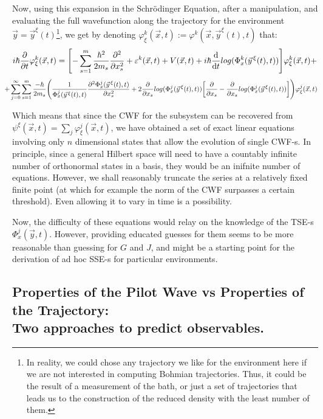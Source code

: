 \documentclass[11pt, a4paper]{article} %
\begin{document}
Now, using this expansion in the Schrödinger Equation, after a manipulation, and evaluating the full wavefunction along the trajectory for the environment $\vec{y}=\vec{y}^\xi(t)$\footnote{In reality, we could chose any trajectory we like for the environment here if we are not interested in computing Bohmian trajectories. Thus, it could be the result of a measurement of the bath, or just a set of trajectories that leads us to the construction of the reduced density with the least number of them.}, we get by denoting $\varphi^k_\xi(\vec{x},t):=\varphi^k(\vec{x},\vec{y}^\xi(t),t)$ that:
\begin{equation}
 i\hbar\pdv{}{t}\varphi^k_\xi(\vec{x},t)=\qty[-\sum_{s=1}^m\frac{\hbar^2}{2m_s}\pdv[2]{}{x_s}+ \varepsilon^k(\vec{x},t)+V(\vec{x},t)   +i\hbar \dv{}{t}log(\Phi^k_x(\vec{y}^{\, \xi}(t),t))]\varphi^k_\xi(\vec{x},t)+
\end{equation}
$$
\hspace{-0.4cm}+\sum_{j=0}^\infty\sum_{s=1}^m \frac{-\hbar}{2m_s}\qty( \frac{1}{\Phi^j_x(\vec{y}^{\, \xi}(t),t)}\pdv[2]{\Phi^j_x(\vec{y}^{\, \xi}(t),t)}{x_s}+2\pdv{}{x_s}log(\Phi^j_x(\vec{y}^{\, \xi}(t),t))\qty[\pdv{}{x_s}-\pdv{}{x_s}log(\Phi^j_x(\vec{y}^{\, \xi}(t),t))] )\varphi^j_\xi(\vec{x},t)
$$

Which means that since the CWF for the subsystem can be recovered from $\psi^\xi(\vec{x},t)=\sum_j \varphi^j_\xi(\vec{x},t)$, we have obtained a set of exact linear equations involving only $n$ dimensional states that allow the evolution of single CWF-s. In principle, since a general Hilbert space will need to have a countably infinite number of orthonormal states in a basis, they would be an inifnite number of equations. However, we shall reasonably truncate the series at a relatively fixed finite point (at which for example the norm of the CWF surpasses a certain threshold). Even allowing it to vary in time is a possibility.

Now, the difficulty of these equations would relay on the knowledge of the TSE-s $\Phi^j_x(\vec{y},t)$. However, providing educated guesses for them seems to be more reasonable than guessing for $G$ and $J$, and might be a starting point for the derivation of ad hoc SSE-s for particular environments.  

 
\subsection*{Properties of the Pilot Wave vs Properties of the Trajectory: \\ Two approaches to predict observables.}
\end{document}
